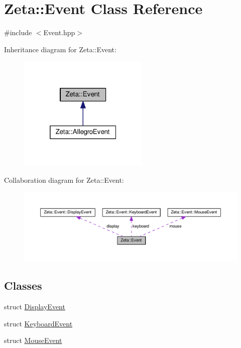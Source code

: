 \hypertarget{classZeta_1_1Event}{\section{Zeta\+:\+:Event Class Reference}
\label{classZeta_1_1Event}
}


{\ttfamily \#include $<$Event.\+hpp$>$}



Inheritance diagram for Zeta\+:\+:Event\+:\nopagebreak
\begin{figure}[H]
\begin{center}
\leavevmode
\includegraphics[width=176pt]{classZeta_1_1Event__inherit__graph}
\end{center}
\end{figure}


Collaboration diagram for Zeta\+:\+:Event\+:\nopagebreak
\begin{figure}[H]
\begin{center}
\leavevmode
\includegraphics[width=350pt]{classZeta_1_1Event__coll__graph}
\end{center}
\end{figure}
\subsection*{Classes}
\begin{DoxyCompactItemize}
\item 
struct \hyperlink{structZeta_1_1Event_1_1DisplayEvent}{Display\+Event}
\item 
struct \hyperlink{structZeta_1_1Event_1_1KeyboardEvent}{Keyboard\+Event}
\item 
struct \hyperlink{structZeta_1_1Event_1_1MouseEvent}{Mouse\+Event}
\end{DoxyCompactItemize}
